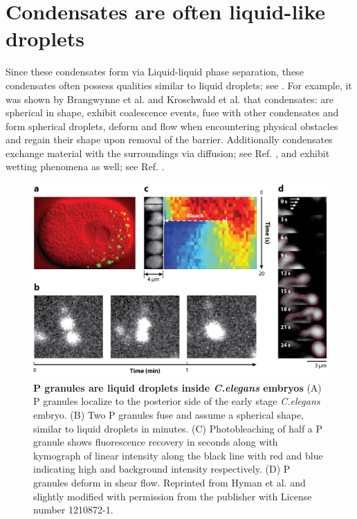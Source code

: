 \section{Condensates are often liquid-like droplets}

Since these condensates form via Liquid-liquid phase separation, these condensates often possess qualities similar to liquid droplets; see .
For example, it was shown by Brangwynne et al. \cite{Brangwynne2009} and Kroschwald et al. \cite{Kroschwald2015} that condensates: are spherical in shape, exhibit coalescence events, fuse with other condensates and form spherical droplets, deform and flow when encountering physical obstacles and regain their shape upon removal of the barrier.
Additionally condensates exchange material with the surroundings via diffusion; see Ref. \cite{Hubatsch2021}, and exhibit wetting phenomena as well; see Ref. \cite{Setru2021}.

\begin{figure}[tb]
\centering
\includegraphics[scale=0.5]{MainContent/BioFigures/liquid_droplet.pdf}
\caption{\textbf{P granules are liquid droplets inside \textit{C.elegans} embryos}
(A) P granules localize to the posterior side of the early stage \textit{C.elegans} embryo.
(B) Two P granules fuse and assume a spherical shape, similar to liquid droplets in minutes.
(C) Photobleaching of half a P granule shows fluorescence recovery in seconds along with kymograph of linear intensity along the black line with red and blue indicating high and background intensity respectively. 
(D) P granules deform in shear flow.
Reprinted from Hyman et al. \cite{Hyman2014} and slightly modified with permission from the publisher with License number 1210872-1.}
\label{fig:liquid_droplet}
\end{figure}

